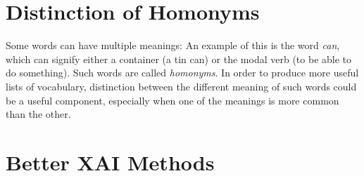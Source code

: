 \section{Distinction of Homonyms}
Some words can have multiple meanings:
An example of this is the word \textit{can}, which can signify either a container (a tin can) or the modal verb (to be able to do something).
Such words are called \textit{homonyms}.
In order to produce more useful lists of vocabulary, distinction between the different meaning of such words could be a useful component, especially when one of the meanings is more common than the other.


\section{Better XAI Methods}








